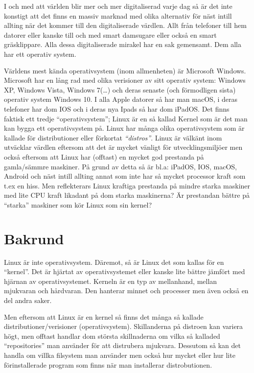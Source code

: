 \documentclass[12pt, a4paper]{report}
\begin{document}
    I och med att världen blir mer och mer digitaliserad varje dag så är det inte konstigt att det finns en massiv marknad med olika alternativ för näst intill allting när det kommer till den digitaliserade värdlen. Allt från telefoner till hem datorer eller kanske till och med smart damsugare eller också en smart gräsklippare. Alla dessa digitaliserade mirakel har en sak gemensamt. Dem alla har ett operativ system.

    Världens mest kända operativsystem (inom allmenheten) är Microsoft Windows. Microsoft har en lång rad med olika verisioner av sitt operativ system\cite{windows}: Windows XP, Windows Vista, Windows 7(\dots) och deras senaste (och förmodligen sista) operativ system Windows 10.
     I alla Apple datorer så har man macOS, i deras telefoner har dom IOS och i deras nya Ipads så har dom iPadOS.
     Det finns faktisk ett tredje ``operativsystem''; Linux är en så kallad Kernel \cite{redhat} som är det man kan bygga ett operativsystem på. Linux har många olika operativsystem som är kallade för distributioner eller förkortat \textit{``distros''}. Linux är välkänt inom utväcklar värdlen eftersom att det är mycket vänligt för utvecklingsmiljöer men också eftersom att Linux har (offtast) en mycket god prestanda på gamla/sämmre maskiner. På grund av detta så är bl.a: iPadOS, IOS, macOS, Android och näst intill allting annat som inte har så mycket processor kraft som t.ex en hiss. Men reflekterars Linux kraftiga prestanda på mindre starka maskiner med lite CPU kraft likadant på dom starka maskinerna? Är prestandan bättre på ``starka'' maskiner som kör Linux som sin kernel?


\section{Bakrund}

    Linux är inte operativsystem. Däremot, så är Linux det som kallas för en ``kernel''\cite{redhat}. Det är hjärtat av operativsystemet eller kanske lite bättre jämfört med hjärnan av operativsystemet. Kerneln är en typ av mellanhand, mellan mjukvaran och hårdvaran. Den hanterar minnet och processer men även också en del andra saker.

    Men eftersom att Linux är en kernel så finns det många så kallade distributioner/verisioner (operativsystem). Skillanderna på distroen kan variera högt, men offtast handlar dom största skillnaderna om vilka så kalladed ``repositories'' man använder för att distrubera mjukvara. Dessutom så kan det handla om villka filsystem man använder men också hur mycket eller hur lite förinstallerade program som finns när man installerar distrobutionen.
    
\end{document}
